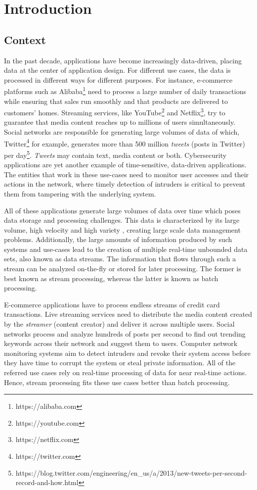 \chapter{Introduction} \label{chap:intro} \minitoc

\section{Context} \label{sec:context}
In the past decade, applications have become increasingly data-driven, placing data at the center of application design. For different use cases, the data is processed in different ways for different purposes. For instance, e-commerce platforms such as Alibaba\footnote{https://alibaba.com} need to process a large number of daily transactions while ensuring that sales run smoothly and that products are delivered to customers' homes. Streaming services, like YouTube\footnote{https://youtube.com} and Netflix\footnote{https://netflix.com}, try to guarantee that media content reaches up to millions of users simultaneously. Social networks are responsible for generating large volumes of data of which,  Twitter\footnote{https://twitter.com} for example, generates more than 500 million \textit{tweets} (posts in Twitter) per day\footnote{https://blog.twitter.com/engineering/en\_us/a/2013/new-tweets-per-second-record-and-how.html}. \textit{Tweets} may contain text, media content or both. Cybersecurity applications are yet another example of time-sensitive, data-driven applications. The entities that work in these use-cases need to monitor user accesses and their actions in the network, where timely detection of intruders is critical to prevent them from tampering with the underlying system.

All of these applications generate large volumes of data over time which poses data storage and processing challenges. This data is characterized by its large volume, high velocity and high variety \cite{Mavragani-GoogleTrends-SLR}, creating large scale data management problems. Additionally, the large amounts of information produced by such systems and use-cases lead to the creation of multiple real-time unbounded data sets, also known as data streams. The information that flows through such a stream can be analyzed on-the-fly or stored for later processing. The former is best known as stream processing, whereas the latter is known as batch processing. 

E-commerce applications have to process endless streams of credit card transactions. Live streaming services need to distribute the media content created by the \textit{streamer} (content creator) and deliver it across multiple users. Social networks process and analyze hundreds of posts per second to find out trending keywords across their network and suggest them to users. Computer network monitoring systems aim to detect intruders and revoke their system access before they have time to corrupt the system or steal private information. All of the referred use cases rely on real-time processing of data for near real-time actions. Hence, stream processing fits these use cases better than batch processing.

